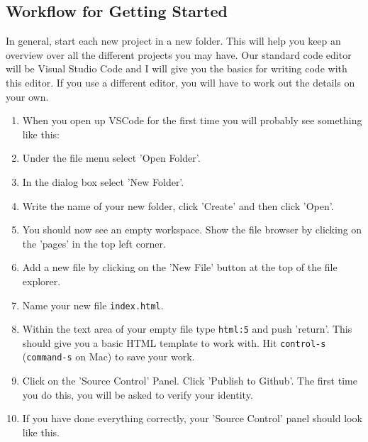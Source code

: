 \documentclass[english,11pt,a4paper]{report}
\begin{document}
\subsection{Workflow for Getting Started}
In general, start each new project in a new folder. This will help you keep an overview over all the different projects you may have. Our standard code editor will be Visual Studio Code and I will give you the basics for writing code with this editor. If you use a different editor, you will have to work out the details on your own.

\renewcommand{\labelenumi}{\arabic{enumi}.}
\begin{enumerate}
    \item When you open up VSCode for the first time you will probably see something like this:
    \item Under the file menu select 'Open Folder'.
    \item In the dialog box select 'New Folder'.
    \item Write the name of your new folder, click 'Create'  and then click 'Open'.
    \item You should now see an empty workspace. Show the file browser by clicking on the 'pages' in the top left corner. 
    \item Add a new file by clicking on the 'New File' button at the top of the file explorer.
    \item Name your new file \verb|index.html|.
    \item Within the text area of your empty file type \verb|html:5| and push 'return'. This should give you a basic HTML template to work with. Hit \verb|control-s| (\verb|command-s| on Mac) to save your work.
    \newpage
    \item Click on the 'Source Control' Panel. Click 'Publish to Github'. The first time you do this, you will be asked to verify your identity.
    \item If you have done everything correctly, your 'Source Control' panel should look like this.
\end{enumerate}
\end{document}
